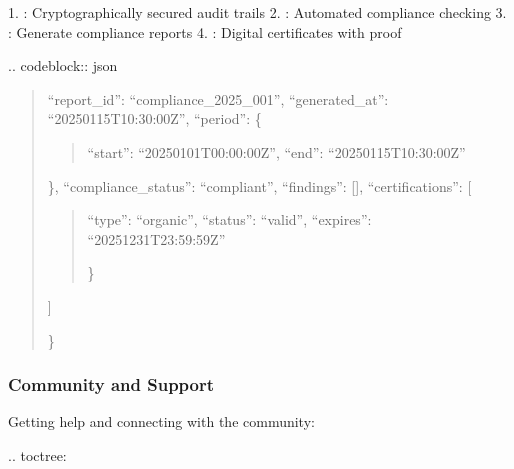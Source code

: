 \documentclass[letterpaper,10pt,english]{sphinxmanual}
\begin{document}
\sphinxAtStartPar
{}
1. : Cryptographically secured audit trails
2. : Automated compliance checking
3. : Generate compliance reports
4. : Digital certificates with proof

\sphinxAtStartPar
{}
.. code\sphinxhyphen{}block:: json
\begin{quote}
\begin{description}
\sphinxlineitem{\{}
\sphinxAtStartPar
“report\_id”: “compliance\_2025\_001”,
“generated\_at”: “2025\sphinxhyphen{}01\sphinxhyphen{}15T10:30:00Z”,
“period”: \{
\begin{quote}

\sphinxAtStartPar
“start”: “2025\sphinxhyphen{}01\sphinxhyphen{}01T00:00:00Z”,
“end”: “2025\sphinxhyphen{}01\sphinxhyphen{}15T10:30:00Z”
\end{quote}

\sphinxAtStartPar
\},
“compliance\_status”: “compliant”,
“findings”: {[}{]},
“certifications”: {[}
\begin{quote}
\begin{description}
\sphinxlineitem{\{}
\sphinxAtStartPar
“type”: “organic”,
“status”: “valid”,
“expires”: “2025\sphinxhyphen{}12\sphinxhyphen{}31T23:59:59Z”

\end{description}

\sphinxAtStartPar
\}
\end{quote}

\sphinxAtStartPar
{]}

\end{description}

\sphinxAtStartPar
\}
\end{quote}


\subsubsection{Community and Support}
\label{\detokenize{user-guide/index:community-and-support}}
\sphinxAtStartPar
Getting help and connecting with the community:

\sphinxAtStartPar
{}
.. toctree:

\begin{sphinxVerbatim}[commandchars=\\\{\}]
 
   

\end{sphinxVerbatim}
\end{document}
